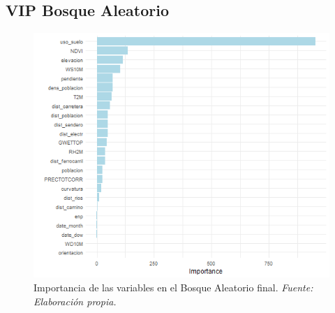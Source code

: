 \documentclass[12pt,a4paper,]{book}
\numberwithin{dummy}{section}
\theoremstyle{ocrenumbox}
\theoremstyle{blacknumex}
\theoremstyle{blacknumbox}
\theoremstyle{ocrenum}
\theoremstyle{ocrenum}
\begin{document}
\hypertarget{vip-bosque-aleatorio}{%
\subsection{VIP Bosque Aleatorio}\label{vip-bosque-aleatorio}}

\begin{figure}[H]
\centering
\includegraphics[width=\textwidth,keepaspectratio]{graficos/rf_vip_final.png}
\caption[Importancia de las variables en el bosque aleatorio final]{Importancia de las variables en el Bosque Aleatorio final. \it Fuente: Elaboración propia.}
\label{fig:rf_vip_final}
\end{figure}




%
\end{document}
